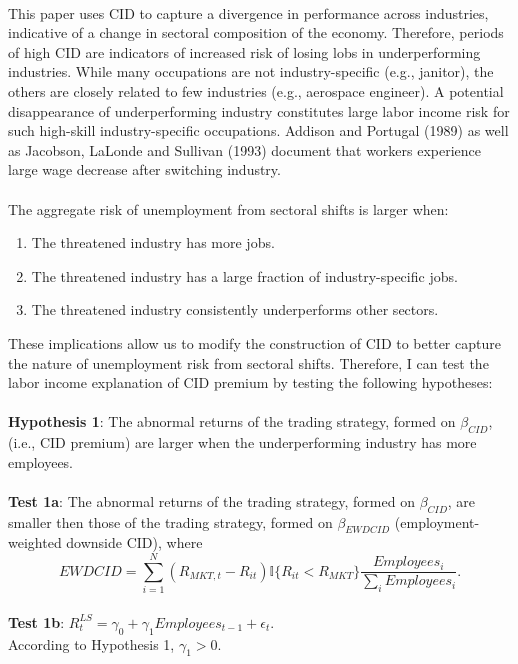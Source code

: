 \documentclass[12pt]{article}
\begin{document}
\paragraph{}
This paper uses CID to capture a divergence in performance across industries, indicative of a change in sectoral composition of the economy. Therefore, periods of high CID are indicators of increased risk of losing lobs in underperforming industries. While many occupations are not industry-specific (e.g., janitor), the others are closely related to few industries (e.g., aerospace engineer). A potential disappearance of underperforming industry constitutes large labor income risk for such high-skill industry-specific occupations. Addison and Portugal (1989) as well as Jacobson, LaLonde and Sullivan (1993) document that workers experience large wage decrease after switching industry. 
\paragraph{}
The aggregate risk of unemployment from sectoral shifts is larger when:
\begin{enumerate}
    \item {The threatened industry has more jobs.}
    \item {The threatened industry has a large fraction of industry-specific jobs.}
    \item {The threatened industry consistently underperforms other sectors.}
\end{enumerate}
These implications allow us to modify the construction of CID to better capture the nature of unemployment risk from sectoral shifts. Therefore, I can test the labor income explanation of CID premium by testing the following hypotheses:
\paragraph{}
\textbf{Hypothesis 1}: The abnormal returns of the trading strategy, formed on $\beta_{CID}$, (i.e., CID premium) are larger when the underperforming industry has more employees.
\paragraph{}
\textbf{Test 1a}: The abnormal returns of the trading strategy, formed on $\beta_{CID}$, are smaller then those of the trading strategy, formed on $\beta_{EWDCID}$ (employment-weighted downside CID), where $$EWDCID = \sum^{N}_{i=1}{(R_{MKT,t}-R_{it}) \mathbb{I}\{R_{it}<R_{MKT}\} \frac{Employees_i}{\sum_{i} Employees_i} }.$$
\\ \-\hspace{0.3cm}
\textbf{Test 1b}: $R^{LS}_{t} = \gamma_0 +\gamma_1 Employees_{t-1}+\epsilon_t$. \\ 
According to Hypothesis 1, $\gamma_1>0$.
\end{document}
